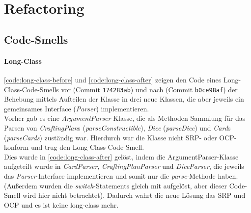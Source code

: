 \chapter{Refactoring}

\section{Code-Smells} \label{sec:smells}

\subsubsection{Long-Class} 

\autoref{code:long-class-before} und \autoref{code:long-class-after} zeigen den Code eines Long-Class-Code-Smells 
vor (Commit \texttt{174283ab}) und nach (Commit \texttt{b0ce98af}) der Behebung mittels Aufteilen der Klasse 
in drei neue Klassen, die aber jeweils ein gemeinsames Interface (\textit{Parser}) implementieren. \\
Vorher gab es eine \textit{ArgumentParser}-Klasse, die als Methoden-Sammlung für das Parsen von 
\textit{CraftingPlan}s (\textit{parseConstructible}), \textit{Dice} (\textit{parseDice}) 
und \textit{Card}s (\textit{parseCards}) zuständig war. Hierdurch war die Klasse nicht SRP- oder OCP-konform 
und trug den Long-Class-Code-Smell. \\
Dies wurde in \autoref{code:long-class-after} gelöst, 
indem die ArgumentParser-Klasse aufgeteilt wurde in \textit{CardParser}, \textit{CraftingPlanParser} und \textit{DiceParser},
die jeweils das \textit{Parser}-Interface implementieren und somit nur die \textit{parse}-Methode haben. 
(Außerdem wurden die \textit{switch}-Statements gleich mit aufgelöst, aber dieser Code-Smell wird hier nicht betrachtet).
Dadurch wahrt die neue Lösung das SRP und OCP und es ist keine long-class mehr. 




